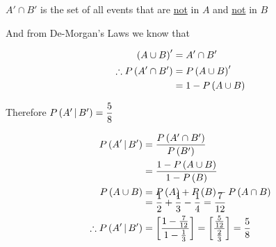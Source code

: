 \documentclass[14pt,fleqn]{extarticle}
\begin{document}
\begin{problem}
\begin{step}
     $A'\cap B'$ is the set of all events that are \underline{not} in $A$ and \underline{not} in $B$\newline 
     
     And from De-Morgan's Laws we know that 
     
     \begin{align}
	\left(A\cup B \right)' &= A'\cap B'  \\
	\therefore P\left( A'\cap B'\right) &= P \left(A\cup B \right)' \\
	&= 1 - P\left( A\cup B\right)
\end{align}
     
\end{step}

\begin{step}
  \begin{options} 
     \correct 
       
     Therefore $P\left(A'\,\vert\,B'\right) = \dfrac{5}{8}$ 
        
    \end{options} 
     \reason 
     
     \begin{align}
	P\left(A'\,\vert\,B'\right) &= \dfrac{P\left( A'\cap B'\right)}{P\left( B'\right)} \\
	&= \dfrac{1-P\left( A\cup B\right)}{1-P\left( B\right)} \\
	P\left( A\cup B\right) &= P\left( A\right) + P\left( B\right) - P\left( A\cap B\right) \\[-10pt]
	&= \frac{1}{2} + \frac{1}{3} - \frac{1}{4} = \frac{7}{12} \\
	\therefore P\left(A'\,\vert\,B'\right) &= \left[\dfrac{1-\frac{7}{12}}{1-\frac{1}{3}}  \right]= \left[\dfrac{\frac{5}{12}}{\frac{2}{3}} \right] = \frac{5}{8}
\end{align}
       
\end{step}
\end{problem} 
\end{document}
